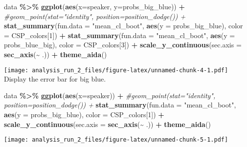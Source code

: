 \documentclass[
]{article}
\newenvironment{Shaded}{\begin{snugshade}}{\end{snugshade}}
\newcommand{\AttributeTok}[1]{\textcolor[rgb]{0.13,0.29,0.53}{#1}}
\newcommand{\CommentTok}[1]{\textcolor[rgb]{0.56,0.35,0.01}{\textit{#1}}}
\newcommand{\DecValTok}[1]{\textcolor[rgb]{0.00,0.00,0.81}{#1}}
\newcommand{\FunctionTok}[1]{\textcolor[rgb]{0.13,0.29,0.53}{\textbf{#1}}}
\newcommand{\NormalTok}[1]{#1}
\newcommand{\SpecialCharTok}[1]{\textcolor[rgb]{0.81,0.36,0.00}{\textbf{#1}}}
\newcommand{\StringTok}[1]{\textcolor[rgb]{0.31,0.60,0.02}{#1}}
\begin{document}
\begin{Shaded}
\begin{Highlighting}[]
\NormalTok{data }\SpecialCharTok{\%\textgreater{}\%} 
  \FunctionTok{ggplot}\NormalTok{(}\FunctionTok{aes}\NormalTok{(}\AttributeTok{x=}\NormalTok{speaker, }\AttributeTok{y=}\NormalTok{probs\_big\_blue)) }\SpecialCharTok{+} 
  \CommentTok{\#geom\_point(stat="identity", position=position\_dodge()) + }
  \FunctionTok{stat\_summary}\NormalTok{(}\AttributeTok{fun.data =} \StringTok{"mean\_cl\_boot"}\NormalTok{, }\FunctionTok{aes}\NormalTok{(}\AttributeTok{y =}\NormalTok{ probs\_big\_blue), }\AttributeTok{color =}\NormalTok{ CSP\_colors[}\DecValTok{1}\NormalTok{]) }\SpecialCharTok{+}
  \FunctionTok{stat\_summary}\NormalTok{(}\AttributeTok{fun.data =} \StringTok{"mean\_cl\_boot"}\NormalTok{, }\FunctionTok{aes}\NormalTok{(}\AttributeTok{y =}\NormalTok{ probs\_blue\_big), }\AttributeTok{color =}\NormalTok{ CSP\_colors[}\DecValTok{3}\NormalTok{]) }\SpecialCharTok{+}
  \FunctionTok{scale\_y\_continuous}\NormalTok{(}\AttributeTok{sec.axis =} \FunctionTok{sec\_axis}\NormalTok{(}\SpecialCharTok{\textasciitilde{}}\NormalTok{ .)) }\SpecialCharTok{+}
  \FunctionTok{theme\_aida}\NormalTok{()}
\end{Highlighting}
\end{Shaded}

\texttt{[image: analysis\_run\_2\_files/figure-latex/unnamed-chunk-4-1.pdf]}
Display the error bar for big blue.

\begin{Shaded}
\begin{Highlighting}[]
\NormalTok{data }\SpecialCharTok{\%\textgreater{}\%} 
  \FunctionTok{ggplot}\NormalTok{(}\FunctionTok{aes}\NormalTok{(}\AttributeTok{x=}\NormalTok{speaker)) }\SpecialCharTok{+} 
  \CommentTok{\#geom\_point(stat="identity", position=position\_dodge()) + }
  \FunctionTok{stat\_summary}\NormalTok{(}\AttributeTok{fun.data =} \StringTok{"mean\_cl\_boot"}\NormalTok{, }\FunctionTok{aes}\NormalTok{(}\AttributeTok{y =}\NormalTok{ probs\_big\_blue), }\AttributeTok{color =}\NormalTok{ CSP\_colors[}\DecValTok{1}\NormalTok{]) }\SpecialCharTok{+}
  \FunctionTok{scale\_y\_continuous}\NormalTok{(}\AttributeTok{sec.axis =} \FunctionTok{sec\_axis}\NormalTok{(}\SpecialCharTok{\textasciitilde{}}\NormalTok{ .)) }\SpecialCharTok{+}
  \FunctionTok{theme\_aida}\NormalTok{()}
\end{Highlighting}
\end{Shaded}

\texttt{[image: analysis\_run\_2\_files/figure-latex/unnamed-chunk-5-1.pdf]}
\end{document}
